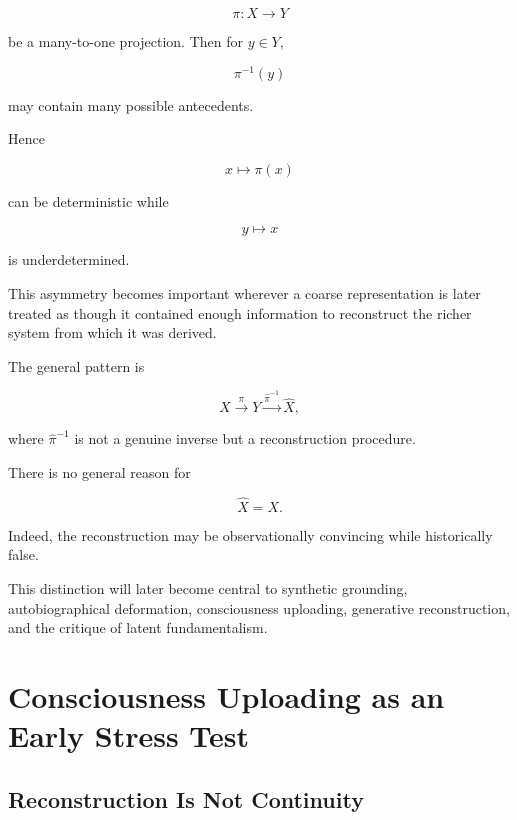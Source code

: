 \documentclass[11pt]{article}
\theoremstyle{remark}
\begin{document}
\begin{equation}
\pi:X\rightarrow Y
\end{equation}

be a many-to-one projection. Then for $y\in Y$,

\begin{equation}
\pi^{-1}(y)
\end{equation}

may contain many possible antecedents.

Hence

\begin{equation}
x\mapsto \pi(x)
\end{equation}

can be deterministic while

\begin{equation}
y\mapsto x
\end{equation}

is underdetermined.

This asymmetry becomes important wherever a coarse representation is later treated as though it contained enough information to reconstruct the richer system from which it was derived.

The general pattern is

\begin{equation}
X
\xrightarrow{\pi}
Y
\xrightarrow{\hat{\pi}^{-1}}
\hat{X},
\end{equation}

where $\hat{\pi}^{-1}$ is not a genuine inverse but a reconstruction procedure.

There is no general reason for

\begin{equation}
\hat{X}=X.
\end{equation}

Indeed, the reconstruction may be observationally convincing while historically false.

This distinction will later become central to synthetic grounding, autobiographical deformation, consciousness uploading, generative reconstruction, and the critique of latent fundamentalism.

\section{Consciousness Uploading as an Early Stress Test}

\subsection{Reconstruction Is Not Continuity}
\end{document}
